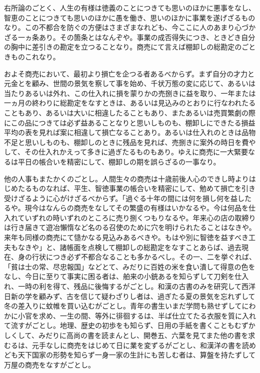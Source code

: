 \documentclass[a4paper, platex, dvipdfmx]{jsarticle}
\begin{document}
右所論のごとく、人生の有様は徳義のことにつきても思いのほかに悪事をなし、智恵のことにつきても思いのほかに愚を働き、思いのほかに事業を遂げざるものなり。この不都合を防ぐの方便はさまざまなれども、今ここに人のあまり心づかざる一ヵ条あり。その箇条とはなんぞや。事業の成否得失につき、ときどき自分の胸中に差引きの勘定を立つることなり。商売にて言えば棚卸しの総勘定のごときものこれなり。

およそ商売において、最初より損亡を企つる者あるべからず。まず自分の才力と元金とを顧み、世間の景気を察して事を始め、千状万態の変に応じて、あるいは当たりあるいは外れ、この仕入れに損を蒙りかの売捌きに益を取り、一年または一ヵ月の終わりに総勘定をなすときは、あるいは見込みのとおりに行なわれたることもあり、あるいは大いに相違したることもあり、またあるいは売買繁劇の際にこの品につきては必ず益あることなりと思いしものも、棚卸しにできたる損益平均の表を見れば案に相違して損亡なることあり。あるいは仕入れのときは品物不足と思いしものも、棚卸しのときに残品を見れば、売捌きに案外の時日を費やして、その仕入れかえって多きに過ぎたるものもあり。ゆえに商売に一大緊要なるは平日の帳合いを精密にして、棚卸しの期を誤らざるの一事なり。

他の人事もまたかくのごとし。人間生々の商売は十歳前後人心のできし時よりはじめたるものなれば、平生、智徳事業の帳合いを精密にして、勉めて損亡を引き受けざるように心がけざるべからず。「過ぐる十年の間には何を損し何を益したるや。現今はなんらの商売をなしてその繁盛の有様はいかなるや。今は何品を仕入れていずれの時いずれのところに売り捌くつもりなるや。年来心の店の取締りは行き届きて遊冶懶惰など名のる召使のために穴を明けられたることはなきや。来年も同様の商売にて慥かなる見込みあるべきや。もはや別に智徳を益すべき工夫もなきや」と、諸帳面を点検して棚卸しの総勘定をなすことあらば、過去現在、身の行状につき必ず不都合なることも多かるべし。その一、二を挙ぐれば、「貧は士の常、尽忠報国」などとて、みだりに百姓の米を食い潰して得意の色をなし、今日に至りて事実に困る者は、舶来の小銃あるを知らずして刀剣を仕入れ、一時の利を得て、残品に後悔するがごとし。和漢の古書のみを研究して西洋日新の学を顧みず、古を信じて疑わざりし者は、過ぎたる夏の景気を忘れずして冬の差入りに蚊帷を買い込むがごとし。青年の書生いまだ学問も熟せずしてにわかに小官を求め、一生の間、等外に徘徊するは、半ば仕立てたる衣服を質に入れて流すがごとし。地理、歴史の初歩をも知らず、日用の手紙を書くこともむずかしくして、みだりに高尚の書を読まんとし、開巻五、六葉を見てまた他の書を求むるは、元手なしに商売をはじめて日に業を変ずるがごとし、和漢洋の書を読めども天下国家の形勢を知らず一身一家の生計にも苦しむ者は、算盤を持たずして万屋の商売をなすがごとし。
\end{document}
